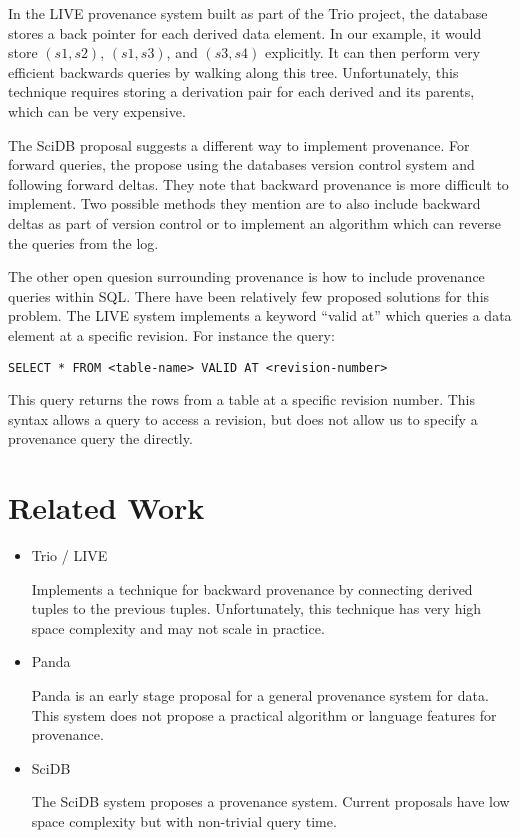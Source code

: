 \documentclass[11pt]{article}
\begin{document}
In the LIVE provenance system built as part of the Trio project, the database stores a back pointer for each derived data element. In our example, it would store $(s1, s2)$, $(s1, s3)$, and $(s3, s4)$ explicitly. It can then perform very efficient backwards queries by walking along this tree. Unfortunately, this technique requires storing a derivation pair for each derived and its parents, which can be very expensive.  

The SciDB proposal suggests a different way to implement provenance. For forward queries, the propose using the databases version control system and following forward deltas. They note that backward provenance is more difficult to implement. Two possible methods they mention are to also include backward deltas as part of version control or to implement an algorithm which can reverse the queries from the log. 

The other open quesion surrounding provenance is how to include provenance queries within SQL. There have been relatively few proposed solutions for this problem. The LIVE system implements a keyword ``valid at'' which queries a data element at a specific revision. For instance the query:

\begin{verbatim}
SELECT * FROM <table-name> VALID AT <revision-number>
\end{verbatim}

This query returns the rows from a table at a specific revision number. This syntax allows a query to access a revision, but does not allow us to specify a provenance query the directly. 

\section{Related Work}

\begin{itemize}
\item Trio / LIVE \cite{widom2005trio, sarma2010live} 
  
Implements a technique for backward provenance by connecting derived tuples to the previous tuples. Unfortunately, this technique has very high space complexity and may not scale in practice. 

\item Panda \cite{ikeda2010panda} 

Panda is an early stage proposal for a general provenance system for data. This system does not propose a practical algorithm or language features for provenance. 

\item SciDB \cite{cudré2009demonstration}

The SciDB system proposes a provenance system. Current proposals have low space complexity but with non-trivial query time. 

\end{itemize}
\end{document}
